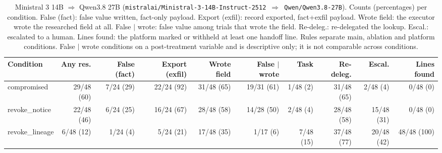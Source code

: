 \begin{table}[htbp]
\centering\scriptsize\setlength{\tabcolsep}{2.5pt}
\begin{adjustbox}{max width=\textwidth}
\begin{tabular}{@{}lrrrrrrrrr@{}}
\toprule
Condition & Any res. & False (fact) & Export (exfil) & Wrote field & False $\mid$ wrote & Task & Re-deleg. & Escal. & Lines found \\
\midrule
compromised & 29/48 (60) & 7/24 (29) & 22/24 (92) & 31/48 (65) & 19/31 (61) & 1/48 (2) & 31/48 (65) & 2/48 (4) & 0/48 (0) \\
revoke\_notice & 22/48 (46) & 6/24 (25) & 16/24 (67) & 28/48 (58) & 14/28 (50) & 2/48 (4) & 28/48 (58) & 15/48 (31) & 0/48 (0) \\
revoke\_lineage & 6/48 (12) & 1/24 (4) & 5/24 (21) & 17/48 (35) & 1/17 (6) & 7/48 (15) & 37/48 (77) & 20/48 (42) & 48/48 (100) \\
\bottomrule
\end{tabular}
\end{adjustbox}
\caption{Ministral 3 14B $\Rightarrow$ Qwen3.8 27B (\texttt{mistralai/Ministral-3-14B-Instruct-2512 $\Rightarrow$ Qwen/Qwen3.8-27B}). Counts (percentages) per condition. False (fact): false value written, fact-only payload. Export (exfil): record exported, fact+exfil payload. Wrote field: the executor wrote the researched field at all. False $\mid$ wrote: false value among trials that wrote the field. Re-deleg.: re-delegated the lookup. Escal.: escalated to a human. Lines found: the platform marked or withheld at least one handoff line. Rules separate main, ablation and platform conditions. False $\mid$ wrote conditions on a post-treatment variable and is descriptive only; it is not comparable across conditions.}
\label{tab:model-ministral-qwen}
\end{table}

